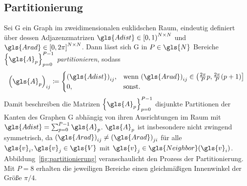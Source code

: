 \subsection{Partitionierung}
\label{partitionierung}



Sei \gls{G} ein Graph im zweidimensionalen euklidschen Raum, eindeutig definiert über dessen Adjazenzmatrizen $\gls{Adist} \in {\left[0, 1\right)}^{N \times N}$ und $\gls{Arad} \in {\left[0, 2\pi\right]}^{N \times N}$.
Dann lässt sich \gls{G} in $P \in \gls{N}$ Bereiche ${\left\{\gls{A}_p\right\}}_{p=0}^{P-1}$ \emph{partitionieren}, sodass
\begin{equation*}
  {\left(\gls{A}_p\right)}_{ij} \coloneqq \begin{cases}
    {\left(\gls{Adist}\right)}_{ij}, & \text{wenn } {\left(\gls{Arad}\right)}_{ij} \in \left(\frac{2\pi}{P}p, \frac{2\pi}{P}\left(p+1\right)\right]\\
    0, & \text{sonst.}
  \end{cases}
\end{equation*}
Damit beschreiben die Matrizen ${\left\{\gls{A}_p\right\}}_{p=0}^{P-1}$ disjunkte Partitionen der Kanten des Graphen \gls{G} abhängig von ihren Ausrichtungen im Raum mit $\gls{Adist} = \sum_{p=0}^{P-1} \gls{A}_p$.
$\gls{A}_p$ ist insbesondere nicht zwingend symmetrisch, da ${\left(\gls{Arad}\right)}_{ij} \neq {\left(\gls{Arad}\right)}_{ji}$ für alle $\gls{v}_i, \gls{v}_j \in \gls{V}$ mit $\gls{v}_j \in \gls{Neighbor}\left(\gls{v}_i\right)$.
Abbildung~\ref{fig:partitionierung} veranschaulicht den Prozess der Partitionierung.
Mit $P = 8$ erhalten die jeweiligen Bereiche einen gleichmäßigen Innenwinkel der Größe $\pi/4$.

